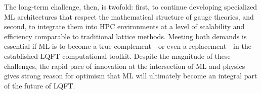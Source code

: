 \documentclass[12pt]{article}
\begin{document}
The long-term challenge, then, is twofold: first, to continue developing specialized ML architectures that respect the mathematical structure of gauge theories, and second, to integrate them into HPC environments at a level of scalability and efficiency comparable to traditional lattice methods. Meeting both demands is essential if ML is to become a true complement—or even a replacement—in the established LQFT computational toolkit. Despite the magnitude of these challenges, the rapid pace of innovation at the intersection of ML and physics gives strong reason for optimism that ML will ultimately become an integral part of the future of LQFT.





\newcommand{\sqcell}[1]{\cellcolor{white}\parbox[c][3.2cm][c]{3.2cm}{\centering #1}}
\end{document}

